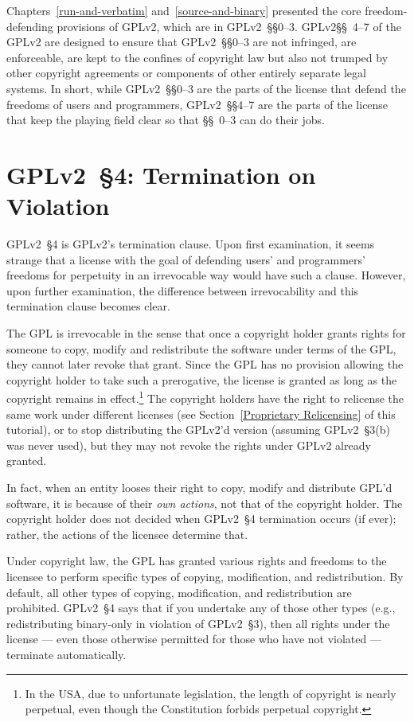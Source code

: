 Chapters~\ref{run-and-verbatim} and~\ref{source-and-binary} presented the
core freedom-defending provisions of GPLv2\@, which are in GPLv2~\S\S0--3.
GPLv2\S\S~4--7 of the GPLv2 are designed to ensure that GPLv2~\S\S0--3 are
not infringed, are enforceable, are kept to the confines of copyright law but
also  not trumped by other copyright agreements or components of other
entirely separate legal systems.  In short, while GPLv2~\S\S0--3 are the parts
of the license that defend the freedoms of users and programmers,
GPLv2~\S\S4--7 are the parts of the license that keep the playing field clear
so that \S\S~0--3 can do their jobs.

\section{GPLv2~\S4: Termination on Violation}
\label{GPLv2s4}

GPLv2~\S4 is GPLv2's termination clause.  Upon first examination, it seems
strange that a license with the goal of defending users' and programmers'
freedoms for perpetuity in an irrevocable way would have such a clause.
However, upon further examination, the difference between irrevocability
and this termination clause becomes clear.

The GPL is irrevocable in the sense that once a copyright holder grants
rights for someone to copy, modify and redistribute the software under terms
of the GPL, they cannot later revoke that grant.  Since the GPL has no
provision allowing the copyright holder to take such a prerogative, the
license is granted as long as the copyright remains in effect.\footnote{In
  the USA, due to unfortunate legislation, the length of copyright is nearly
  perpetual, even though the Constitution forbids perpetual copyright.} The
copyright holders have the right to relicense the same work under different
licenses (see Section~\ref{Proprietary Relicensing} of this tutorial), or to
stop distributing the GPLv2'd version (assuming GPLv2~\S3(b) was never used),
but they may not revoke the rights under GPLv2 already granted.

In fact, when an entity looses their right to copy, modify and distribute
GPL'd software, it is because of their \emph{own actions}, not that of the
copyright holder.  The copyright holder does not decided when GPLv2~\S4
termination occurs (if ever); rather, the actions of the licensee determine
that.

Under copyright law, the GPL has granted various rights and freedoms to
the licensee to perform specific types of copying, modification, and
redistribution.  By default, all other types of copying, modification, and
redistribution are prohibited.  GPLv2~\S4 says that if you undertake any of
those other types (e.g., redistributing binary-only in violation of GPLv2~\S3),
then all rights under the license --- even those otherwise permitted for
those who have not violated --- terminate automatically.

